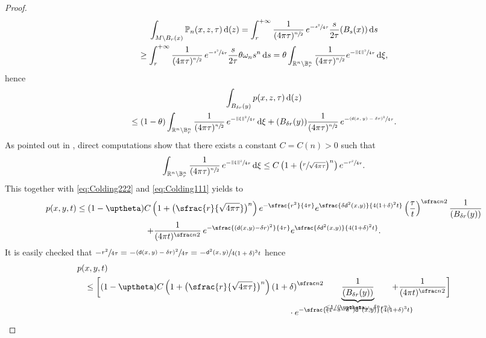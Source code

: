 \documentclass[10pt]{amsart}
\newcommand{\NoChangel}[1]{%
\expandafter\let\csname old\string#1\endcsname=#1
\let#1=\relax
\newcommand{#1}{\mathcode`l="716C\csname old\string#1\endcsname\mathcode`l="7160 }%
}
\theoremstyle{plain}
\theoremstyle{definition}
\newcommand{\setR}{\mathbb{R}}
\newcommand{\bP}{\mathbb{P}}
\newcommand{\setB}{\mathbb{B}}
\newcommand{\di}{\mathop{}\!\mathrm{d}}
\newcommand{\dist}{\mathsf{d}}
\DeclareMathOperator{\vol}{vol}\NoChangel{\vol}
\begin{document}
\begin{proof}
\begin{multline*}
\int_{M\setminus B_r(x)}\bP_n(x,z,\tau)\di \vol(z) =\int_{r}^{+\infty} \frac{1}{(4\pi \tau)^{\sfrac n2}}\,e^{-\sfrac{s^2}{4\tau}}\frac{s}{2\tau}\vol(B_s(x))\di s\\
\ge \int_{r}^{+\infty} \frac{1}{(4\pi \tau)^{\sfrac n2}}\,e^{-\sfrac{s^2}{4\tau}}\frac{s}{2\tau} \theta \omega_n s^n \di s = \theta \int_{\setR^n\setminus \setB_r^n}\frac{1}{(4\pi \tau)^{\sfrac n2}}e^{-\sfrac{\|\xi\|^2}{4\tau}}\di \xi,
\end{multline*}
hence
\begin{multline}\label{eq:Colding222}
\int_{B_{\delta r}(y)}p(x,z,\tau)\di \vol(z)\\
\le (1-\theta)\int_{\setR^n\setminus \setB_r^n}\frac{1}{(4\pi \tau)^{\sfrac n2}}\,e^{-\sfrac{\|\xi\|^2}{4\tau}}\di \xi +\vol(B_{\delta r}(y)) \frac{1}{(4\pi \tau)^{\sfrac n2}}\,e^{-\sfrac{(\dist(x,y)-\delta r)^2}{4\tau}}.
\end{multline}
As pointed out in \cite[Form.\,(2.6)]{LiTamWang}, direct computations show that there exists a constant $C=C(n)>0$ such that
\[
\int_{\setR^n\setminus \setB_r^n}\frac{1}{(4\pi \tau)^{\sfrac n2}}\,e^{-\sfrac{\|\xi\|^2}{4\tau}}\di \xi \le C\left(1+\bigl(\sfrac{r}{\sqrt{4\pi\tau}}\bigr)^n\right)e^{-\sfrac{r^2}{4\tau}}.
\]
This together with \eqref{eq:Colding222} and \eqref{eq:Colding111} yields to
\begin{multline*}
p(x,y,t)\le (1-\uptheta) C\left(1+\bigl(\sfrac{r}{\sqrt{4\pi\tau}}\bigr)^n\right)e^{-\sfrac{r^2}{4\tau}}e^{\sfrac{\delta \dist^2(x,y)}{4(1+\delta)^2t}} \left(\frac{\tau}{t}\right)^{\sfrac n2}\frac{1}{\vol (B_{\delta r}(y))}\\
+\frac{1}{(4\pi t)^{\sfrac n2}}\,e^{-\sfrac{(\dist(x,y)-\delta r)^2}{4\tau}}e^{\sfrac{\delta \dist^2(x,y)}{4(1+\delta)^2t}}.
\end{multline*}
It is easily checked that $
-\sfrac{r^2}{4\tau} =-\sfrac{(\dist(x,y)-\delta r)^2}{4\tau} = - \sfrac{\dist^2(x,y)}{4(1+\delta)^3 t}$
hence
\begin{align*}
p(&x,y,t)\\
&\le\biggl[(1-\uptheta) C\left(1+\bigl(\sfrac{r}{\sqrt{4\pi\tau}} \bigr)^n \right)\left(1+\delta\right)^{\sfrac n2}\underbrace{\frac{1}{\vol (B_{\delta r}(y))}}_{\le 1/(\uptheta \omega_n \delta^n r^n)}+\frac{1}{(4\pi t)^{\sfrac n2}}\biggr]\\[-10pt]
&\hspace*{8.5cm}\cdot e^{-\sfrac{(1-\delta-\delta^2)\dist^2(x,y)}{4(1+\delta)^3t}}\\

\end{align*}
\end{proof}
\end{document}

